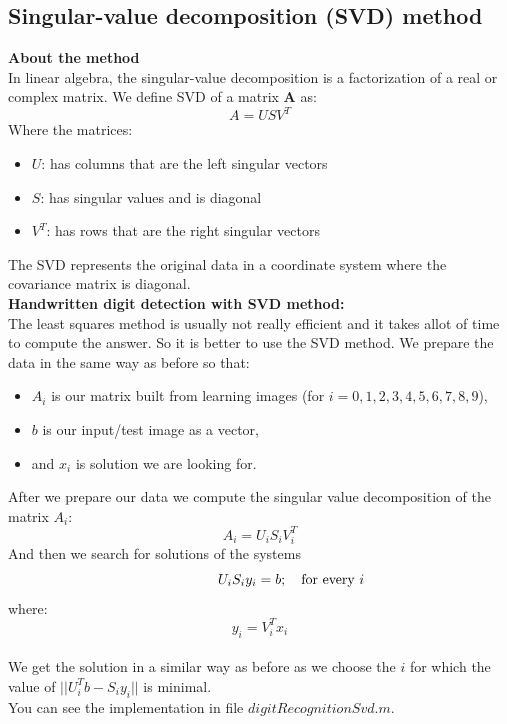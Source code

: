 \documentclass[12pt]{article}
\begin{document}
\newpage
\subsection{Singular-value decomposition (SVD) method}
\textbf{About the method}\\
\newline
In linear algebra, the singular-value decomposition is a factorization of a real or complex matrix.
We define SVD of a matrix \textbf{A} as:\\
\[
A = U S V^{T}
\]
\newline
Where the matrices:
\begin{itemize}
	\item $U$: has columns that are the left singular vectors
	\item $S$: has singular values and is diagonal
	\item $V^{T}$: has rows that are the right singular vectors
\end{itemize}
The SVD represents the original data in a coordinate system where the covariance matrix is diagonal.\\
\newline
\textbf{Handwritten digit detection with SVD method:}\\
\newline
The least squares method is usually not really efficient and it takes allot of time to compute the answer. So it is better to use the SVD method. We prepare the data in the same way as before so that:
\begin{itemize}
	\item $A_{i}$ is our matrix built from learning images (for $i = 0, 1, 2, 3, 4, 5, 6, 7, 8, 9$),
	\item $b$ is our input/test image as a vector,
	\item and $x_{i}$ is solution we are looking for.
\end{itemize}
After we prepare our data we compute the singular value decomposition of the matrix $A_{i}$:\\
\[
A_{i} = U_{i} S_{i} V^{T}_{i}
\]
\newline
And then we search for solutions of the systems 
\[
U_{i} S_{i} y_{i} = b ;\quad \rlap{\text for every {$i$}}
\]
\newline
where:
\[
y_{i} = V^{T}_{i} x_{i}
\]\\
\newline
We get the solution in a similar way as before as we choose the $i$ for which the value of  \textbf{$|| U^{T}_{i} b - S_{i}y_{i} ||$}  is minimal.\\
\newline
You can see the implementation in file $digitRecognitionSvd.m$.
\end{document}
